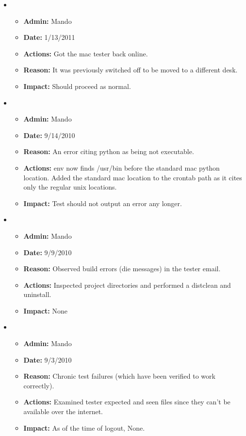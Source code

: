 \documentclass[12pt]{article}
\begin{document}
\begin{itemize}
\item 
\begin{itemize}
\item[] {\bf Admin:} Mando
\item[] {\bf Date:} 1/13/2011
\item[] {\bf Actions:} Got the mac tester back online.
\item[] {\bf Reason:}  It was previously switched off to be moved to a different desk.
\item[] {\bf Impact:}  Should proceed as normal.
\end{itemize}

\item 
\begin{itemize}
\item[] {\bf Admin:} Mando
\item[] {\bf Date:} 9/14/2010
\item[] {\bf Reason:} An error citing python as being not executable. 
\item[] {\bf Actions:} env now finds /usr/bin before the standard mac python location. Added the standard mac location to the crontab path as it cites only the regular unix locations.
\item[] {\bf Impact:} Test should not output an error any longer.
\end{itemize}
	
\item 
\begin{itemize}
\item[] {\bf Admin:} Mando
\item[] {\bf Date:} 9/9/2010
\item[] {\bf Reason:} Observed build errors (die messages) in the tester email. 
\item[] {\bf Actions:} Inspected project directories and performed a distclean and uninstall.
\item[] {\bf Impact:} None
\end{itemize}

\item 
\begin{itemize}
\item[] {\bf Admin:} Mando
\item[] {\bf Date:} 9/3/2010
\item[] {\bf Reason:} Chronic test failures (which have been verified to work correctly). 
\item[] {\bf Actions:} Examined tester expected and seen files since they can't be available over the internet.
\item[] {\bf Impact:} As of the time of logout, None.
\end{itemize}
	

\end{itemize}
\end{document}
